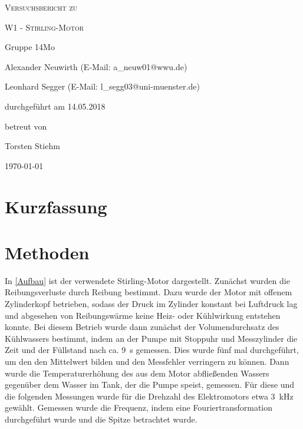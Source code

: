 \documentclass[
	a4paper,
	12pt,
	pagesize,
	ngerman
]{scrartcl}
\begin{document}
	
	\begin{titlepage}
		\centering
		{\scshape\LARGE Versuchsbericht zu \par}
		\vspace{1cm}
		{\scshape\huge W1 - Stirling-Motor \par} 
		\vspace{2.5cm}
		{\LARGE Gruppe 14Mo \par}
		\vspace{0.5cm}
		
		{\large Alexander Neuwirth (E-Mail: a\_neuw01@wwu.de) \par}
		{\large Leonhard Segger (E-Mail: l\_segg03@uni-muenster.de) \par}
		\vfill
		
		durchgeführt am 14.05.2018\par 
		betreut von\par
		{\large Torsten Stiehm} 
		
		\vfill
		
		{\large \today\par}
	\end{titlepage}
	\tableofcontents
	\newpage

	\section{Kurzfassung}
	
	\section{Methoden} \label{sec_Methoden}
	
	In \cref{Aufbau} ist der verwendete Stirling-Motor dargestellt.
	Zunächst wurden die Reibungsverluste durch Reibung bestimmt.
	Dazu wurde der Motor mit offenem Zylinderkopf betrieben, sodass der Druck im Zylinder konstant bei Luftdruck lag und abgesehen von Reibungswärme keine Heiz- oder Kühlwirkung entstehen konnte.
	Bei diesem Betrieb wurde dann zunächst der Volumendurchsatz des Kühlwassers bestimmt, indem an der Pumpe mit Stoppuhr und Messzylinder die Zeit und der Füllstand nach ca. \SI{9}{s} gemessen.
	Dies wurde fünf mal durchgeführt, um den den Mittelwert bilden und den Messfehler verringern zu können.
	Dann wurde die Temperaturerhöhung des aus dem Motor abfließenden Wassers gegenüber dem Wasser im Tank, der die Pumpe speist, gemessen.
	Für diese und die folgenden Messungen wurde für die Drehzahl des Elektromotors etwa \SI{3}{\kilo \hertz} gewählt.
	Gemessen wurde die Frequenz, indem eine Fouriertransformation durchgeführt wurde und die Spitze betrachtet wurde.
	
\end{document}
